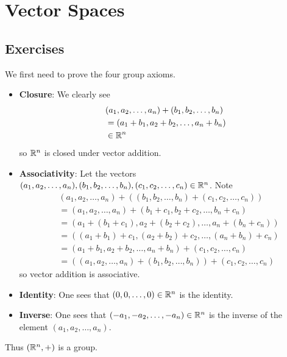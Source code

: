 \section{Vector Spaces}
\subsection*{Exercises}
\begin{questions}
    \item We first need to prove the four group axioms.
    \begin{itemize}
        \item \textbf{Closure}: We clearly see
        \begin{align*}
            &(a_1, a_2, \dots, a_n) + (b_1, b_2, \dots, b_n)\\
            &= (a_1 + b_1, a_2 + b_2, \dots, a_n + b_n)\\
            &\in \mathbb{R}^n
        \end{align*}
        so $\mathbb{R}^n$ is closed under vector addition.

        \item \textbf{Associativity}: Let the vectors $(a_1, a_2, \dots, a_n), (b_1, b_2, \dots, b_n), \linebreak (c_1, c_2, \dots, c_n) \in \R^n$. Note
        \begin{align*}
            &(a_1, a_2, \dots, a_n) + \left((b_1, b_2, \dots, b_n) + (c_1, c_2, \dots, c_n)\right)\\
            &= (a_1, a_2, \dots, a_n) + (b_1 + c_1, b_2 + c_2, \dots, b_n + c_n)\\
            &= (a_1 + (b_1 + c_1), a_2 + (b_2 + c_2), \dots, a_n + (b_n + c_n))\\
            &= ((a_1 + b_1) + c_1, (a_2 + b_2) + c_2, \dots, (a_n + b_n) + c_n)\\
            &= (a_1 + b_1, a_2 + b_2, \dots, a_n + b_n) + (c_1, c_2, \dots, c_n)\\
            &= \left((a_1, a_2, \dots, a_n) + (b_1, b_2, \dots, b_n)\right) + (c_1, c_2, \dots, c_n)
        \end{align*}
        so vector addition is associative.

        \item \textbf{Identity}: One sees that $(0, 0, \dots, 0) \in \mathbb{R}^n$ is the identity.

        \item \textbf{Inverse}: One sees that $(-a_1, -a_2, \dots, -a_n) \in \mathbb{R}^n$ is the inverse of the element $(a_1, a_2, \dots, a_n)$.
    \end{itemize}
    Thus $(\mathbb{R}^n, +)$ is a group.


\end{questions}
